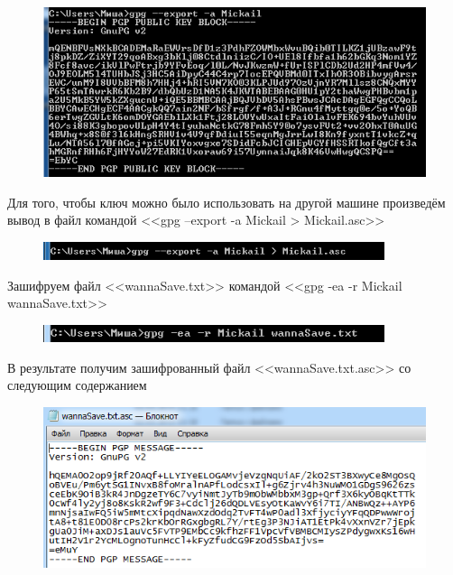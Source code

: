 \documentclass[utf8x, 12pt]{G7-32}
\begin{document}
\begin{figure}[hhh!]
	\begin{center}
		\includegraphics[width=12cm]{img/8_3}
	\end{center}
\end{figure}	


Для того, чтобы ключ можно было использовать на другой машине произведём вывод в файл командой <<gpg --export -a Mickail > Mickail.asc>>

\begin{figure}[hhh!]
	\begin{center}
		\includegraphics[width=10cm]{img/8_4}
	\end{center}
\end{figure}	

Зашифруем файл <<wannaSave.txt>> командой <<gpg -ea -r Mickail wannaSave.txt>>

\begin{figure}[hhh!]
	\begin{center}
		\includegraphics[width=10cm]{img/8_5}
	\end{center}
\end{figure}	

\newpage

В результате получим зашифрованный файл <<wannaSave.txt.asc>> со следующим содержанием

\begin{figure}[hhh!]
	\begin{center}
		\includegraphics[width=12cm]{img/8_6}
	\end{center}
\end{figure}	
\end{document}
